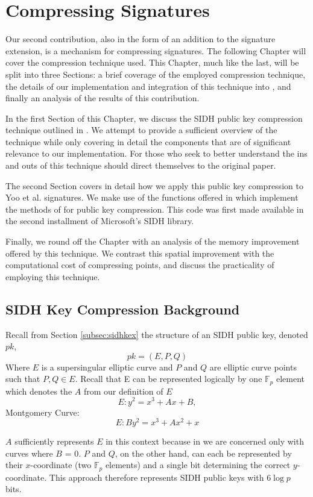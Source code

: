 \chapter{Compressing Signatures}
\label{sec:compress}

Our second contribution, also in the form of an addition to the \sidh signature extension, is a mechanism for compressing signatures. The following Chapter will cover the compression technique used. This Chapter, much like the last, will be split into three Sections: a brief coverage of the employed compression technique, the details of our implementation and integration of this technique into \sidh, and finally an analysis of the results of this contribution.

In the first Section of this Chapter, we discuss the SIDH public key compression technique outlined in \cite{compwr}. We attempt to provide a sufficient overview of the technique while only covering in detail the components that are of significant relevance to our implementation. For those who seek to better understand the ins and outs of this technique should direct themselves to the original paper.  

The second Section covers in detail how we apply this public key compression to Yoo et al. signatures. We make use of the functions offered in \cite{pkcomp} which implement the methods of \cite{compwr} for public key compression. This code was first made available in the second installment of Microsoft's SIDH library.

Finally, we round off the Chapter with an analysis of the memory improvement offered by this technique. We contrast this spatial improvement with the computational cost of compressing points, and discuss the practicality of employing this technique. 

\section{SIDH Key Compression Background}

Recall from Section \ref{subsec:sidhkex} the structure of an SIDH public key, denoted $pk$,
$$
pk = (E, P, Q)
$$
Where $E$ is a supersingular elliptic curve and $P$ and $Q$ are elliptic curve points such that $P, Q \in E$. Recall that E can be represented logically by one $\mathbb{F}_{p}$ element which denotes the $A$ from our definition of $E$
$$
E : y^2 = x^3 + Ax + B,
$$
Montgomery Curve:
$$
E: By^2 = x^3 + Ax^2 + x
$$

$A$ sufficiently represents $E$ in this context because in \sidh we are concerned only with curves where $B$ = 0. $P$ and $Q$, on the other hand, can each be represented by their $x$-coordinate (two $\mathbb{F}_{p}$ elements) and a single bit determining the correct $y$-coordinate. This approach therefore represents SIDH public keys with $6\log p$ bits.

